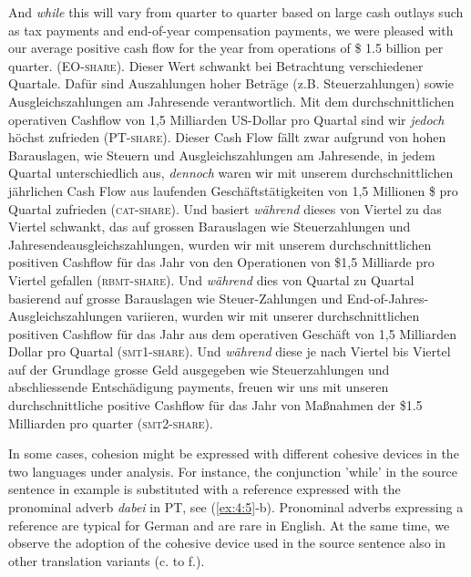 \documentclass[output=paper]{LSP/langsci}
\begin{document}
\ea \label{ex:4:4}
\ea And \textit{while} this will vary from quarter to quarter based on large cash outlays such as tax payments and end-of-year compensation payments, we were pleased with our average positive cash flow for the year from operations of \$ 1.5 billion per quarter. (EO-\textsc{share}).
\ex Dieser Wert schwankt bei Betrachtung verschiedener Quartale. Dafür sind Auszahlungen hoher Beträge (z.B. Steuerzahlungen) sowie Ausgleichszahlungen am Jahresende verantwortlich. Mit dem durchschnittlichen operativen Cashflow von 1,5 Milliarden US-Dollar pro Quartal sind wir \textit{jedoch} höchst zufrieden (PT-\textsc{share}).
\ex  Dieser Cash Flow fällt zwar aufgrund von hohen Barauslagen, wie Steuern und Ausgleichszahlungen am Jahresende, in jedem Quartal unterschiedlich aus, \textit{dennoch} waren wir mit unserem durchschnittlichen jährlichen Cash Flow aus laufenden Geschäftstätigkeiten von 1,5 Millionen \$ pro Quartal zufrieden (\textsc{cat}-\textsc{share}).
\ex  Und basiert \textit{während} dieses von Viertel zu das Viertel schwankt, das auf grossen Barauslagen wie Steuerzahlungen und Jahresendeausgleichszahlungen, wurden wir mit unserem durchschnittlichen positiven Cashflow für das Jahr von den Operationen von \$1,5 Milliarde pro Viertel gefallen (\textsc{rbmt}-\textsc{share}).
\ex  Und \textit{während} dies von Quartal zu Quartal basierend auf grosse Barauslagen wie Steuer-Zahlungen und End-of-Jahres-Ausgleichszahlungen variieren, wurden wir mit unserer durchschnittlichen positiven Cashflow für das Jahr aus dem operativen Geschäft von 1,5 Milliarden Dollar pro Quartal (\textsc{smt}1-\textsc{share}).
\ex  Und \textit{während} diese je nach Viertel bis Viertel auf der Grundlage grosse Geld ausgegeben wie Steuerzahlungen und abschliessende Entschädigung payments, freuen wir uns mit unseren durchschnittliche positive Cashflow für das Jahr von Maßnahmen der \$1.5 Milliarden pro quarter (\textsc{smt}2-\textsc{share}).
\z
\z

In some cases, cohesion might be expressed with different cohesive devices in the two languages under analysis. For instance, the conjunction 'while' in the source sentence in example  is substituted with a reference expressed with the pronominal adverb \textit{dabei} in PT, see (\ref{ex:4:5}-b). Pronominal adverbs expressing a reference are typical for German and are rare in English. At the same time, we observe the adoption of the cohesive device used in the source sentence also in other translation variants (c. to f.).
\end{document}
